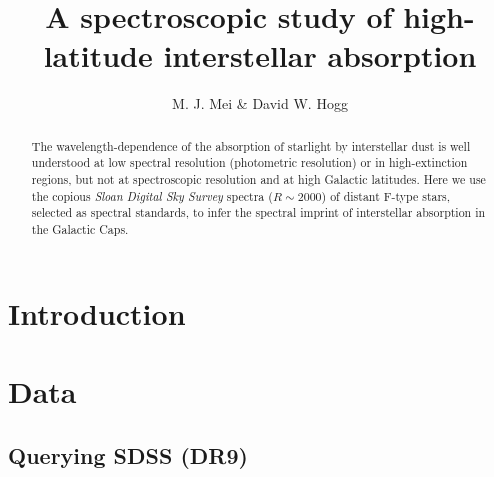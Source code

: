 \documentclass[preprint]{aastex}
\begin{document}
\title{A spectroscopic study of high-latitude interstellar absorption}

\author{M. J. Mei \& David W. Hogg}


\begin{abstract}
The wavelength-dependence of the absorption of starlight by interstellar dust
  is well understood at low spectral resolution (photometric resolution)
  or in high-extinction regions,
  but not at spectroscopic resolution and at high Galactic latitudes.
Here we use the copious \textsl{Sloan Digital Sky Survey} spectra ($R\sim 2000$)
  of distant F-type stars,
  selected as spectral standards,
  to infer the spectral imprint of interstellar absorption in the Galactic Caps.
\end{abstract}


\section{Introduction}

\section{Data}
\subsection{Querying SDSS (DR9)}
\end{document}
